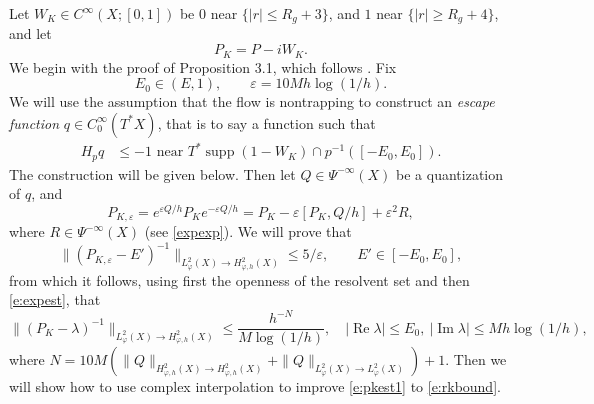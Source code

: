 \documentclass[reqno, 12pt]{amsart}
\newcommand \eps {\varepsilon}
\DeclareMathOperator \re {Re}
\DeclareMathOperator \im {Im}
\DeclareMathOperator \supp {supp}
\theoremstyle{definition}
\numberwithin{equation}{section}
\numberwithin{prop}{section}
\numberwithin{figure}{section}
\begin{document}
Let $W_K \in C^\infty(X;[0,1])$ be $0$ near  $\{|r| \le R_g+3\}$, and $1$ near $\{|r| \ge R_g + 4\}$, and let %
\[
P_K = P - iW_K.
\]
We begin with the proof of Proposition 3.1, which follows \cite[\S4]{sz}. Fix
\[
E_0 \in (E,1), \qquad \eps = 10Mh\log(1/h).
\]
We will use the assumption that the flow is nontrapping to construct an \textit{escape function} $q \in C_0^\infty(T^*X)$, that is to say a function such that
\begin{equation}\label{e:escfunck}\begin{split}
 H_p q &\le -1 \textrm{ near } T^*\supp(1-W_K) \cap p^{-1}([-E_0,E_0]).
\end{split}\end{equation}
The construction will be given below. Then let $Q \in \Psi^{-\infty}(X)$ be a quantization of $q$, and
\[
P_{K,\eps} = e^{\eps Q/h}P_K e^{-\eps Q/h} = P_K - \eps [P_K,Q/h] + \eps^2 R,
\]
where $R \in \Psi^{-\infty}(X)$ (see \eqref{expexp}). We will prove that
\begin{equation}\label{e:pkepsest}
\|(P_{K,\eps} - E')^{-1}\|_{L^2_\varphi(X) \to H^2_{\varphi,h}(X)} \le 5 /\eps, \qquad E' \in [-E_0,E_0],
\end{equation}
from which it follows, using first  the openness of the resolvent set and then  \eqref{e:expest}, that
 \begin{equation}\label{e:pkest1}
\|(P_K - \lambda)^{-1}\|_{L^2_\varphi(X) \to H^2_{\varphi,h}(X)} \le \frac{h^{-N}}{M \log(1/h)}, \quad |\re \lambda| \le E_0, \ |\im \lambda| \le M h \log(1/h),
\end{equation}
where $N=10M(\|Q\|_{H^2_{\varphi,h}(X) \to H^2_{\varphi,h}(X)} + \|Q\|_{L^2_\varphi(X) \to L^2_{\varphi}(X)} )+1$.
Then we will show how to use complex interpolation to improve \eqref{e:pkest1} to \eqref{e:rkbound}.
\end{document}
